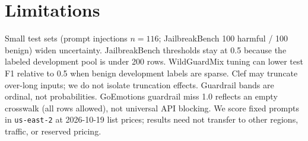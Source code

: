 \section{Limitations}
\label{sec:limitations}

Small test sets (prompt injections $n=116$; JailbreakBench 100 harmful / 100 benign) widen uncertainty.
JailbreakBench thresholds stay at 0.5 because the labeled development pool is under 200 rows.
WildGuardMix tuning can lower test F1 relative to 0.5 when benign development labels are sparse.
Clef may truncate over-long inputs; we do not isolate truncation effects.
Guardrail bands are ordinal, not probabilities.
GoEmotions guardrail miss 1.0 reflects an empty crosswalk (all rows allowed), not universal API blocking.
We score fixed prompts in \texttt{us-east-2} at 2026-10-19 list prices; results need not transfer to other regions, traffic, or reserved pricing.
